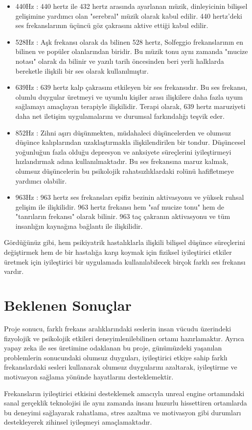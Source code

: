 \documentclass[12pt, a4paper]{article}
\begin{document}
\begin{itemize}
		\item 440Hz : 440 hertz ile 432 hertz arasında ayarlanan müzik, dinleyicinin bilişsel gelişimine yardımcı olan "serebral" müzik olarak kabul edilir. 440 hertz'deki ses frekanslarının üçüncü göz çakrasını aktive ettiği kabul edilir.
		
		\item 528Hz : Aşk frekansı olarak da bilinen 528 hertz, Solfeggio frekanslarının en bilinen ve popüler olanlarından biridir. Bu müzik tonu aynı zamanda "mucize notası" olarak da bilinir ve yazılı tarih öncesinden beri yerli halklarda bereketle ilişkili bir ses olarak kullanılmıştır. 
		
		\item 639Hz : 639 hertz kalp çakrasını etkileyen bir ses frekansıdır. Bu ses frekansı, olumlu duygular üretmeyi ve uyumlu kişiler arası ilişkilere daha fazla uyum sağlamayı amaçlayan terapiyle ilişkilidir. Terapi olarak, 639 hertz maruziyeti daha net iletişim uygulamalarını ve durumsal farkındalığı teşvik eder.
		
		\item 852Hz : Zihni aşırı düşünmekten, müdahaleci düşüncelerden ve olumsuz düşünce kalıplarından uzaklaştırmakla ilişkilendirilen bir tondur. Düşüncesel yoğunluğun fazla olduğu depresyon ve anksiyete süreçlerini iyileştirmeyi hızlandırmak adına kullanılmaktadır. Bu ses frekansına maruz kalmak, olumsuz düşüncelerin bu psikolojik rahatsızlıklardaki rolünü hafifletmeye yardımcı olabilir.
		
		\item 963Hz : 963 hertz ses frekansları epifiz bezinin aktivasyonu ve yüksek ruhsal gelişim ile ilişkilidir. 963 hertz frekansı hem "saf mucize tonu" hem de "tanrıların frekansı" olarak bilinir. 963 taç çakranın aktivasyonu ve tüm insanlığın kaynağına bağlantı ile ilişkilidir.
	\end{itemize}	
	
	Gördüğünüz gibi, hem psikiyatrik hastalıklarla ilişkili bilişsel düşünce süreçlerini değiştirmek hem de bir hastalığa karşı koymak için fiziksel iyileştirici etkiler üretmek için iyileştirici bir uygulamada kullanılabilecek birçok farklı ses frekansı vardır\cite{benefits}. 
	
	\section{Beklenen Sonuçlar}
	Proje sonucu, farklı frekans aralıklarındaki seslerin insan vücudu üzerindeki fizyolojik ve psikolojik etkileri deneyimlenilebilinen ortamı hazırlamaktır. 
	Ayrıca yapay zeka ile ses üretimine odaklanan bu proje, günümüzdeki yaşanılan problemlerin sonucundaki olumsuz duyguları, iyileştirici etkiye sahip farklı frekanslardaki sesleri kullanarak olumsuz duygularını azaltarak, iyileştirme ve motivasyon sağlama yönünde hayatlarını desteklemektir.	\newline
	
	
	Frekansların iyileştirici etkisini desteklemek amacıyla unreal engine ortamındaki sanal gerçeklik teknolojisi ile  aynı zamanda insanı huzurlu hissettiren ortamlarda bu deneyimi sağlayarak rahatlama, stres azaltma ve motivasyon gibi durumları destekleyerek zihinsel iyileşmeyi amaçlamaktadır.
	\newpage
	
	
	
\end{document}
